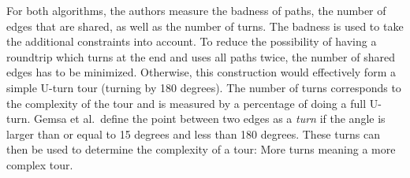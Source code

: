 For both algorithms, the authors measure the badness of paths, the number of edges that are shared, as well as the number of turns.
The badness is used to take the additional constraints into account. 
To reduce the possibility of having a roundtrip which turns at the end and uses all paths twice, the number of shared edges has to be minimized.
Otherwise, this construction would effectively form a simple U-turn tour (turning by 180 degrees).
The number of turns corresponds to the complexity of the tour and is measured by a percentage of doing a full U-turn. 
Gemsa et al.\ define the point between two edges as a \textit{turn} if the angle is larger than or equal to 15 degrees and less than 180 degrees.
These turns can then be used to determine the complexity of a tour:
More turns meaning a more complex tour.


%
%
%
%
